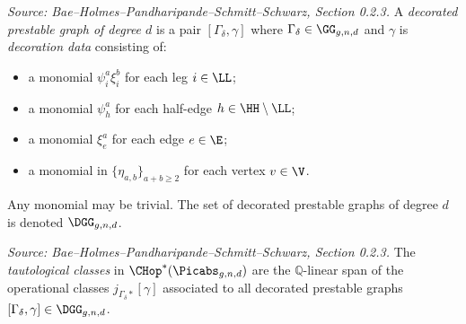 \begin{definition}
  \label{def:decorated_prestable_graph}
  \textit{Source: Bae--Holmes--Pandharipande--Schmitt--Schwarz, Section 0.2.3.}
  A \emph{decorated prestable graph of degree $d$} is a pair $[\Gamma_\delta, \gamma]$
  where $\Gamma_\delta \in \GG_{g,n,d}$ and $\gamma$ is \emph{decoration data} consisting of:
  \begin{itemize}
  \item a monomial $\psi_i^a \xi_i^b$ for each leg $i \in \LL$;
  \item a monomial $\psi_h^a$ for each half-edge $h \in \HH \setminus \LL$;
  \item a monomial $\xi_e^a$ for each edge $e \in \E$;
  \item a monomial in $\{\eta_{a,b}\}_{a+b \geq 2}$ for each vertex $v \in \V$.
  \end{itemize}
  Any monomial may be trivial.  The set of decorated prestable graphs of degree $d$
  is denoted $\DGG_{g,n,d}$.
\end{definition}

\begin{definition}
  \label{def:tautological_ring}
  \textit{Source: Bae--Holmes--Pandharipande--Schmitt--Schwarz, Section 0.2.3.}
  The \emph{tautological classes} in $\CHop^*(\Picabs_{g,n,d})$ are the
  $\mathbb{Q}$-linear span of the operational classes $j_{\Gamma_\delta*}[\gamma]$
  associated to all decorated prestable graphs $[\Gamma_\delta, \gamma] \in \DGG_{g,n,d}$.
\end{definition}

